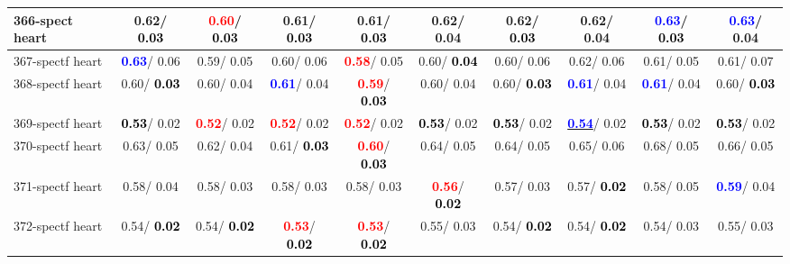 \begin{table}[h]
\begin{center}
{\begin{tabular}{lc|c|c|c|c|c|c|c|c}
366-spect heart &   0.62/\textcolor{black}{\textbf{  0.03}} & \textcolor{red}{\textbf{  0.60}}/\textcolor{black}{\textbf{  0.03}} &   0.61/\textcolor{black}{\textbf{  0.03}} &   0.61/\textcolor{black}{\textbf{  0.03}} &   0.62/  0.04 &   0.62/\textcolor{black}{\textbf{  0.03}} &   0.62/  0.04 & \textcolor{blue}{\textbf{  0.63}}/\textcolor{black}{\textbf{  0.03}} & \textcolor{blue}{\textbf{  0.63}}/  0.04 \\ \hline
367-spectf heart & \textcolor{blue}{\textbf{  0.63}}/  0.06 &   0.59/  0.05 &   0.60/  0.06 & \textcolor{red}{\textbf{  0.58}}/  0.05 &   0.60/\textcolor{black}{\textbf{  0.04}} &   0.60/  0.06 &   0.62/  0.06 &   0.61/  0.05 &   0.61/  0.07 \\
368-spectf heart &   0.60/\textcolor{black}{\textbf{  0.03}} &   0.60/  0.04 & \textcolor{blue}{\textbf{  0.61}}/  0.04 & \textcolor{red}{\textbf{  0.59}}/\textcolor{black}{\textbf{  0.03}} &   0.60/  0.04 &   0.60/\textcolor{black}{\textbf{  0.03}} & \textcolor{blue}{\textbf{  0.61}}/  0.04 & \textcolor{blue}{\textbf{  0.61}}/  0.04 &   0.60/\textcolor{black}{\textbf{  0.03}} \\
369-spectf heart & \textcolor{black}{\textbf{  0.53}}/  0.02 & \textcolor{red}{\textbf{  0.52}}/  0.02 & \textcolor{red}{\textbf{  0.52}}/  0.02 & \textcolor{red}{\textbf{  0.52}}/  0.02 & \textcolor{black}{\textbf{  0.53}}/  0.02 & \textcolor{black}{\textbf{  0.53}}/  0.02 & \underline{\textcolor{blue}{\textbf{  0.54}}}/  0.02 & \textcolor{black}{\textbf{  0.53}}/  0.02 & \textcolor{black}{\textbf{  0.53}}/  0.02 \\
370-spectf heart &   0.63/  0.05 &   0.62/  0.04 &   0.61/\textcolor{black}{\textbf{  0.03}} & \textcolor{red}{\textbf{  0.60}}/\textcolor{black}{\textbf{  0.03}} &   0.64/  0.05 &   0.64/  0.05 &   0.65/  0.06 &   0.68/  0.05 &   0.66/  0.05 \\
371-spectf heart &   0.58/  0.04 &   0.58/  0.03 &   0.58/  0.03 &   0.58/  0.03 & \textcolor{red}{\textbf{  0.56}}/\textcolor{black}{\textbf{  0.02}} &   0.57/  0.03 &   0.57/\textcolor{black}{\textbf{  0.02}} &   0.58/  0.05 & \textcolor{blue}{\textbf{  0.59}}/  0.04 \\
372-spectf heart &   0.54/\textcolor{black}{\textbf{  0.02}} &   0.54/\textcolor{black}{\textbf{  0.02}} & \textcolor{red}{\textbf{  0.53}}/\textcolor{black}{\textbf{  0.02}} & \textcolor{red}{\textbf{  0.53}}/\textcolor{black}{\textbf{  0.02}} &   0.55/  0.03 &   0.54/\textcolor{black}{\textbf{  0.02}} &   0.54/\textcolor{black}{\textbf{  0.02}} &   0.54/  0.03 &   0.55/  0.03 \\

\end{tabular}}
\end{center}
\end{table}
